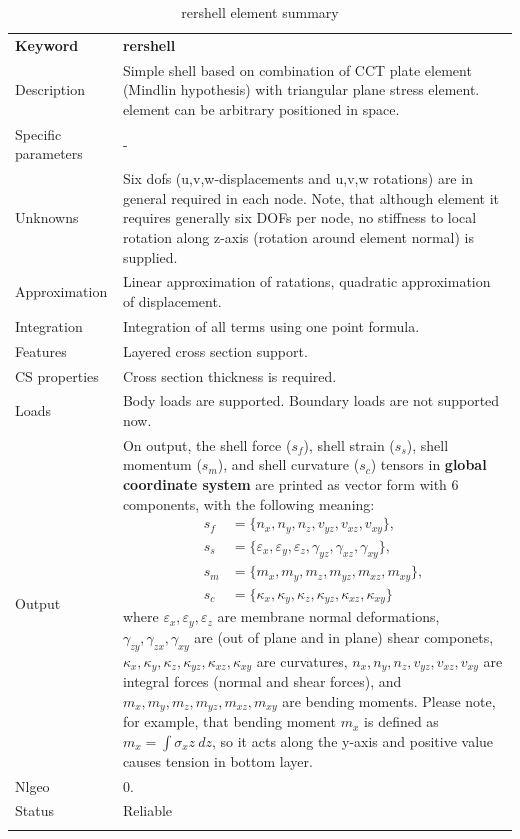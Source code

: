 \documentclass[a4paper]{article}
\newcommand{\param}[1]{\texttt{#1}} %
\newcommand{\templabel}{}%
\newcommand{\tempcaption}{}%
\newcounter{nelpar}
\newenvironment{elementsummary}[5]{%
  \gdef\tempcaption{#4}%
  \gdef\templabel{#5}%
  \setcounter{nelpar}{0}%
  \begin{center} %
    \begin{table}[!htb] %
      \begin{tabular}{|l|p{9cm}|}\hline %
        {\bf Keyword} & \bf{#1}\\ %
        {Description} & {#2}\\ %
        {Specific parameters} & {#3}\\ \hline %
}{
  \\ \hline %
      \end{tabular}%
      \caption{\tempcaption}%
      \label{\templabel}%
    \end{table}%
  \end{center}%
}
\newcommand{\elementParam}[1]{%
  \ifthenelse{\value{nelpar}>0} %
             {&{#1}}%
             {\setcounter{nelpar}{1}Parameters&{#1}}%
             \\%
}
\newcommand{\elementDescription}[2]{{#1} & {#2}\\}
\begin{document}
\begin{elementsummary}{rershell}{Simple shell based on combination of CCT plate element (Mindlin hypothesis) with triangular plane stress element. element can be arbitrary positioned in space.}{-}{rershell element summary}{rershellsummary}
\elementDescription{Unknowns}{Six dofs (u,v,w-displacements and u,v,w rotations) are in general required in each node. Note, that although element it requires generally six DOFs per node, no stiffness to local rotation along z-axis (rotation around element normal) is supplied.}
\elementDescription{Approximation}{Linear approximation of ratations, quadratic approximation of displacement.}
\elementDescription{Integration}{Integration of all terms using one point formula.}
\elementDescription{Features}{Layered cross section support.}
\elementDescription{CS properties}{Cross section thickness is required.}
\elementDescription{Loads}{Body loads are supported. Boundary loads are not supported now.}
\elementDescription{Output}{On output, the shell force ($s_f$), shell strain ($s_s$), shell momentum ($s_m$), and shell curvature ($s_c$) tensors in \textbf{global coordinate system} are printed as vector form with 6 components, with the following meaning:
\begin{align*}
s_f &= \{n_x, n_y, n_z, v_{yz}, v_{xz}, v_{xy}\},\\
s_s &= \{\varepsilon_x, \varepsilon_y, \varepsilon_z, \gamma_{yz}, \gamma_{xz}, \gamma_{xy}\},\\
s_m &= \{m_x, m_y, m_z, m_{yz}, m_{xz}, m_{xy}\},\\
s_c &= \{\kappa_x, \kappa_y, \kappa_z, \kappa_{yz}, \kappa_{xz}, \kappa_{xy}\}
\end{align*}
where $\varepsilon_x, \varepsilon_y, \varepsilon_z$ are membrane normal deformations, $\gamma_{zy}, \gamma_{zx}, \gamma_{xy}$ are (out of plane and in plane) shear componets, $\kappa_x, \kappa_y, \kappa_z, \kappa_{yz}, \kappa_{xz}, \kappa_{xy}$ are curvatures, $n_x, n_y, n_z, v_{yz}, v_{xz}, v_{xy}$ are integral forces (normal and shear forces), and $m_x, m_y, m_z, m_{yz}, m_{xz}, m_{xy}$ are bending moments. 
Please note, for example, that bending moment $m_x$ is defined as $m_x=\int \sigma_x z\ dz$, so it acts along the y-axis and positive value causes tension in bottom layer.}
\elementDescription{Nlgeo}{0.}
\elementDescription{Status}{Reliable}
\end{elementsummary}
\end{document}
